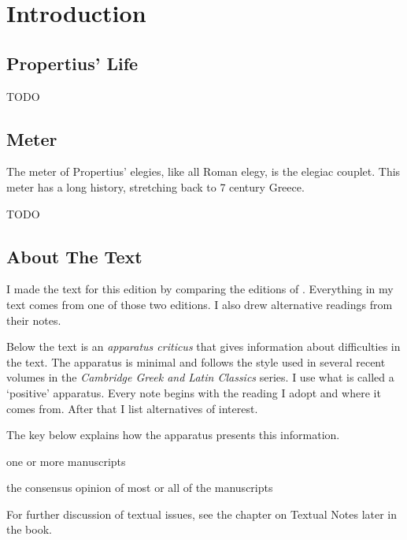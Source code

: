 \chapter*{Introduction}

\section*{Propertius' Life}

TODO




\section*{Meter}

The meter of Propertius' elegies, like all Roman elegy, is the elegiac couplet. This meter has a long history, stretching back to 7 century Greece.

TODO

\indent\metra{\m\mbb\m\mbb\m\mbb\m\m\b\b\m\b\b\m\mb}

\indent\indent\metra{\m\mbb\m\mbb\m\c\m\b\b\m\b\b\mb}\newline

\section*{About The Text}

I made the text for this edition by comparing the editions of \citet{goold1990}. Everything in my text comes from one of those two editions. I also drew alternative readings from their notes.

Below the text is an \textit{apparatus criticus} that gives information about difficulties in the text.  The apparatus is minimal and follows the style used in several recent volumes in the \textit{Cambridge Greek and Latin Classics} series.  I use what is called a `positive' apparatus.  Every note begins with the reading I adopt and where it comes from.  After that I list alternatives of interest.  

The key below explains how the apparatus presents this information.

\begin{description}%
    [style=sameline,leftmargin=70pt,labelwidth=\widthof{\textbf{Name}}]
    \item[m] one or more manuscripts
    \item[M] the consensus opinion of most or all of the manuscripts
\end{description}

For further discussion of textual issues, see the chapter on Textual Notes later in the book.

